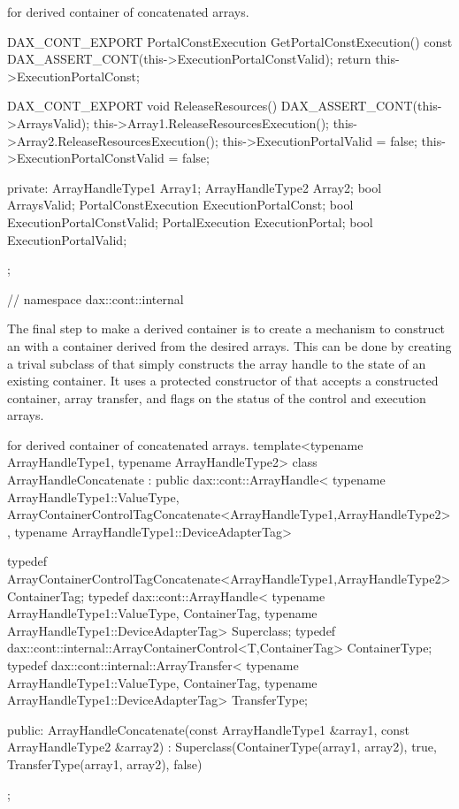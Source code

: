 \begin{daxexample}[ex:DerivedArrayTransfer]{ for derived container of concatenated arrays.}
{{{{  DAX_CONT_EXPORT
  PortalConstExecution GetPortalConstExecution() const {
    DAX_ASSERT_CONT(this->ExecutionPortalConstValid);
    return this->ExecutionPortalConst;
  }

  DAX_CONT_EXPORT
  void ReleaseResources() {
    DAX_ASSERT_CONT(this->ArraysValid);
    this->Array1.ReleaseResourcesExecution();
    this->Array2.ReleaseResourcesExecution();
    this->ExecutionPortalValid = false;
    this->ExecutionPortalConstValid = false;
  }

private:
  ArrayHandleType1 Array1;
  ArrayHandleType2 Array2;
  bool ArraysValid;
  PortalConstExecution ExecutionPortalConst;
  bool ExecutionPortalConstValid;
  PortalExecution ExecutionPortal;
  bool ExecutionPortalValid;
};

}
}
} // namespace dax::cont::internal
\end{daxexample}


The final step to make a derived container is to create a mechanism to
construct an  with a container derived from the
desired arrays. This can be done by creating a trival subclass of
 that simply constructs the array handle to the state
of an existing container. It uses a protected constructor of
 that accepts a constructed container, array transfer,
and flags on the status of the control and execution arrays. 

\begin{daxexample}{ for derived container of concatenated arrays.}
template<typename ArrayHandleType1, typename ArrayHandleType2>
class ArrayHandleConcatenate
  : public dax::cont::ArrayHandle<
      typename ArrayHandleType1::ValueType,
      ArrayContainerControlTagConcatenate<ArrayHandleType1,ArrayHandleType2>,
      typename ArrayHandleType1::DeviceAdapterTag>
{
  typedef ArrayContainerControlTagConcatenate<ArrayHandleType1,ArrayHandleType2>
      ContainerTag;
  typedef dax::cont::ArrayHandle<
      typename ArrayHandleType1::ValueType,
      ContainerTag,
      typename ArrayHandleType1::DeviceAdapterTag> Superclass;
  typedef dax::cont::internal::ArrayContainerControl<T,ContainerTag> ContainerType;
  typedef dax::cont::internal::ArrayTransfer<
      typename ArrayHandleType1::ValueType,
      ContainerTag,
      typename ArrayHandleType1::DeviceAdapterTag> TransferType;

public:
  ArrayHandleConcatenate(const ArrayHandleType1 &array1, const ArrayHandleType2 &array2)
    : Superclass(ContainerType(array1, array2),
                 true,
                 TransferType(array1, array2),
                 false)
  {  }
};
\end{daxexample}

